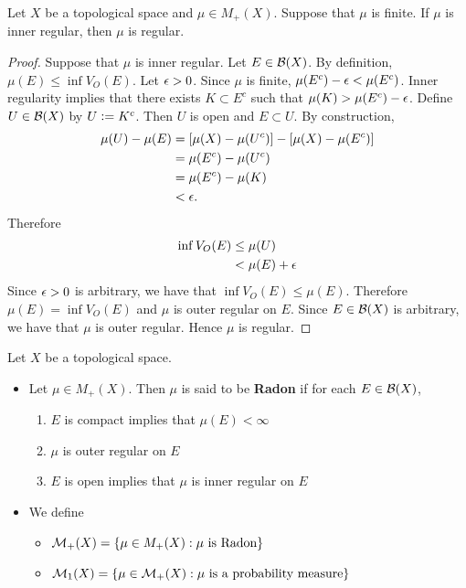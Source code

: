 \documentclass{book}
\begin{document}
	\begin{ex} 
		Let $X$ be a topological space and $\mu \in M_+(X)$. Suppose that $\mu$ is finite. If $\mu$ is inner regular, then $\mu$ is regular.
	\end{ex}	

	\begin{proof}
		Suppose that $\mu$ is inner regular. Let $E \in \mathcal{B}(X)$. By definition, $\mu(E) \leq \inf V_O(E)$. Let $\epsilon > 0$. Since $\mu$ is finite, $\mu(E^c) -\epsilon < \mu(E^c)$. Inner regularity implies that there exists $K \subset E^c$ such that $\mu(K) > \mu(E^c) - \epsilon$. Define $U \in \mathcal{B}(X)$ by $U \vcentcolon= K^c$. Then $U$ is open and $E \subset U$. By construction,
		\begin{align*}
			\mu(U) - \mu(E) 
			& = [\mu(X) - \mu(U^c)] - [\mu(X) - \mu(E^c)] \\
			& = \mu(E^c) - \mu(U^c) \\
			& = \mu(E^c) - \mu(K) \\
			& < \epsilon.
		\end{align*}
		Therefore
		\begin{align*}
			\inf V_O(E)
			& \leq \mu(U) \\
			& < \mu(E) + \epsilon 
		\end{align*}
		Since $\epsilon > 0$ is arbitrary, we have that $\inf V_O(E) \leq \mu(E)$. Therefore $\mu(E) = \inf V_O(E)$ and $\mu$ is outer regular on $E$. Since $E \in \mathcal{B}(X)$ is arbitrary, we have that $\mu$ is outer regular. Hence $\mu$ is regular.
	\end{proof}

	\begin{defn}  
	Let $X$ be a topological space. 
	\begin{itemize}
		\item Let $\mu \in M_+(X)$. Then $\mu$ is said to be \textbf{Radon} if for each $E \in \mathcal{B}(X)$, 
		\begin{enumerate}
			\item $E$ is compact implies that $\mu(E) < \infty$
			\item $\mu$ is outer regular on $E$
			\item $E$ is open implies that $\mu$ is inner regular on $E$
		\end{enumerate}
		\item We define 
		\begin{itemize}
			\item $\mathcal{M}_+(X) = \{\mu \in M_+(X): \mu \text{ is Radon}\}$
			\item $\mathcal{M}_1(X) = \{\mu \in \mathcal{M}_+(X) : \mu \text{ is a probability measure}\}$
		\end{itemize}
	\end{itemize}
	\end{defn}
\end{document}
